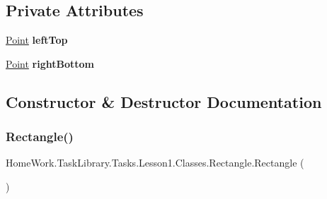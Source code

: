 \subsection*{Private Attributes}
\begin{DoxyCompactItemize}
\item 
\mbox{\label{class_home_work_1_1_task_library_1_1_tasks_1_1_lesson1_1_1_classes_1_1_rectangle_a28b56a5c16fbacd4fad2999f83bd21e1}} 
\mbox{\hyperlink{struct_home_work_1_1_task_library_1_1_tasks_1_1_lesson1_1_1_classes_1_1_point}{Point}} {\bfseries left\+Top}
\item 
\mbox{\label{class_home_work_1_1_task_library_1_1_tasks_1_1_lesson1_1_1_classes_1_1_rectangle_a33c3140baa3679dabe36253298cfb38a}} 
\mbox{\hyperlink{struct_home_work_1_1_task_library_1_1_tasks_1_1_lesson1_1_1_classes_1_1_point}{Point}} {\bfseries right\+Bottom}
\end{DoxyCompactItemize}


\subsection{Constructor \& Destructor Documentation}
\mbox{\label{class_home_work_1_1_task_library_1_1_tasks_1_1_lesson1_1_1_classes_1_1_rectangle_a2528ed8b6229a69e75df312f5f578df1}} 
\subsubsection{\texorpdfstring{Rectangle()}{Rectangle()}\hspace{0.1cm}{\footnotesize\ttfamily [1/3]}}
{\footnotesize\ttfamily Home\+Work.\+Task\+Library.\+Tasks.\+Lesson1.\+Classes.\+Rectangle.\+Rectangle (\begin{DoxyParamCaption}{ }\end{DoxyParamCaption})}



